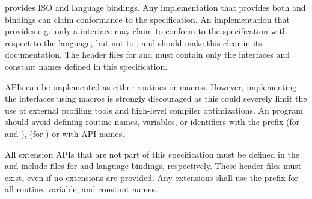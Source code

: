 \openshmem provides ISO \Cstd and \Fortran[90] language bindings.
Any implementation that provides both \Cstd and \Fortran bindings can claim
conformance to the specification. An implementation that provides e.g.\ only a
\Cstd interface may claim to conform to the \openshmem specification with
respect to the \Cstd language, but not to \Fortran, and should make this
clear in its documentation. The \openshmem header files for \Cstd and
\Fortran must contain only the interfaces and constant names defined in this
specification.

\openshmem \ac{API}s can be implemented as either routines or macros. However,
implementing the interfaces using macros is strongly discouraged as this could
severely limit the use of external profiling tools and high-level compiler
optimizations. An \openshmem program should avoid defining routine names,
variables, or identifiers with the prefix \shmemprefix (for \Cstd and
\Fortran), \shmemprefixC (for \Cstd) or with \openshmem \ac{API} names.

All \openshmem extension \ac{API}s that are not part of this specification must
be defined in the  and  include files for
\Cstd and \Fortran language bindings, respectively.  These header files
must exist, even if no extensions are provided.  Any extensions shall use the
 prefix for all routine, variable, and constant names.
